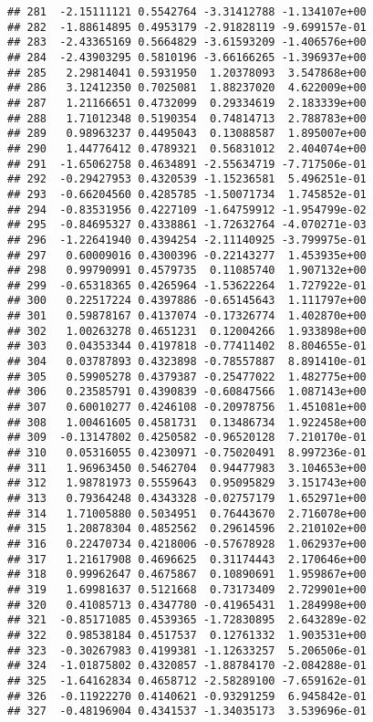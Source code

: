 \documentclass[
]{article}
\begin{document}
\begin{verbatim}
## 281  -2.15111121 0.5542764 -3.31412788 -1.134107e+00
## 282  -1.88614895 0.4953179 -2.91828119 -9.699157e-01
## 283  -2.43365169 0.5664829 -3.61593209 -1.406576e+00
## 284  -2.43903295 0.5810196 -3.66166265 -1.396937e+00
## 285   2.29814041 0.5931950  1.20378093  3.547868e+00
## 286   3.12412350 0.7025081  1.88237020  4.622009e+00
## 287   1.21166651 0.4732099  0.29334619  2.183339e+00
## 288   1.71012348 0.5190354  0.74814713  2.788783e+00
## 289   0.98963237 0.4495043  0.13088587  1.895007e+00
## 290   1.44776412 0.4789321  0.56831012  2.404074e+00
## 291  -1.65062758 0.4634891 -2.55634719 -7.717506e-01
## 292  -0.29427953 0.4320539 -1.15236581  5.496251e-01
## 293  -0.66204560 0.4285785 -1.50071734  1.745852e-01
## 294  -0.83531956 0.4227109 -1.64759912 -1.954799e-02
## 295  -0.84695327 0.4338861 -1.72632764 -4.070271e-03
## 296  -1.22641940 0.4394254 -2.11140925 -3.799975e-01
## 297   0.60009016 0.4300396 -0.22143277  1.453935e+00
## 298   0.99790991 0.4579735  0.11085740  1.907132e+00
## 299  -0.65318365 0.4265964 -1.53622264  1.727922e-01
## 300   0.22517224 0.4397886 -0.65145643  1.111797e+00
## 301   0.59878167 0.4137074 -0.17326774  1.402870e+00
## 302   1.00263278 0.4651231  0.12004266  1.933898e+00
## 303   0.04353344 0.4197818 -0.77411402  8.804655e-01
## 304   0.03787893 0.4323898 -0.78557887  8.891410e-01
## 305   0.59905278 0.4379387 -0.25477022  1.482775e+00
## 306   0.23585791 0.4390839 -0.60847566  1.087143e+00
## 307   0.60010277 0.4246108 -0.20978756  1.451081e+00
## 308   1.00461605 0.4581731  0.13486734  1.922458e+00
## 309  -0.13147802 0.4250582 -0.96520128  7.210170e-01
## 310   0.05316055 0.4230971 -0.75020491  8.997236e-01
## 311   1.96963450 0.5462704  0.94477983  3.104653e+00
## 312   1.98781973 0.5559643  0.95095829  3.151743e+00
## 313   0.79364248 0.4343328 -0.02757179  1.652971e+00
## 314   1.71005880 0.5034951  0.76443670  2.716078e+00
## 315   1.20878304 0.4852562  0.29614596  2.210102e+00
## 316   0.22470734 0.4218006 -0.57678928  1.062937e+00
## 317   1.21617908 0.4696625  0.31174443  2.170646e+00
## 318   0.99962647 0.4675867  0.10890691  1.959867e+00
## 319   1.69981637 0.5121668  0.73173409  2.729901e+00
## 320   0.41085713 0.4347780 -0.41965431  1.284998e+00
## 321  -0.85171085 0.4539365 -1.72830895  2.643289e-02
## 322   0.98538184 0.4517537  0.12761332  1.903531e+00
## 323  -0.30267983 0.4199381 -1.12633257  5.206506e-01
## 324  -1.01875802 0.4320857 -1.88784170 -2.084288e-01
## 325  -1.64162834 0.4658712 -2.58289100 -7.659162e-01
## 326  -0.11922270 0.4140621 -0.93291259  6.945842e-01
## 327  -0.48196904 0.4341537 -1.34035173  3.539696e-01

\end{verbatim}
\end{document}
